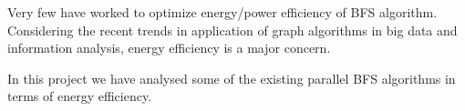 Very few have worked to optimize energy/power efficiency of BFS algorithm.
Considering the recent trends in application of graph algorithms in big data
and information analysis, energy efficiency is a major concern.

In this project we have analysed some of the existing parallel BFS algorithms
in terms of energy efficiency.


